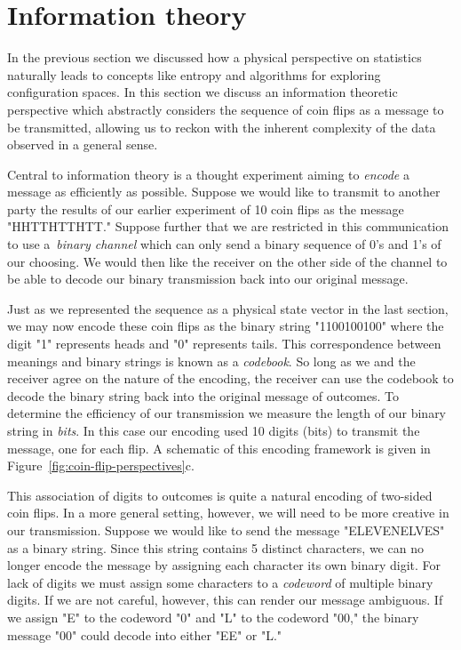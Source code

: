 \section{Information theory}
In the previous section we discussed how a physical perspective on statistics naturally leads to concepts like entropy and algorithms for exploring configuration spaces. In this section we discuss an information theoretic perspective which abstractly considers the sequence of coin flips as a message to be transmitted, allowing us to reckon with the inherent complexity of the data observed in a general sense. 

Central to information theory is a thought experiment aiming to \emph{encode} a message as efficiently as possible. Suppose we would like to transmit to another party the results of our earlier experiment of 10 coin flips as the message "HHTTHTTHTT." Suppose further that we are restricted in this communication to use a~\emph{binary channel} which can only send a binary sequence of 0's and 1's of our choosing. We would then like the receiver on the other side of the channel to be able to decode our binary transmission back into our original message. 

Just as we represented the sequence as a physical state vector in the last section, we may now encode these coin flips as the binary string "1100100100" where the digit "1" represents heads and "0" represents tails. This correspondence between meanings and binary strings is known as a \emph{codebook}. So long as we and the receiver agree on the nature of the encoding, the receiver can use the codebook to decode the binary string back into the original message of outcomes. To determine the efficiency of our transmission we measure the length of our binary string in \emph{bits}. In this case our encoding used 10 digits (bits) to transmit the message, one for each flip. A schematic of this encoding framework is given in Figure~\ref{fig:coin-flip-perspectives}c.

This association of digits to outcomes is quite a natural encoding of two-sided coin flips. In a more general setting, however, we will need to be more creative in our transmission. Suppose we would like to send the message "ELEVENELVES" as a binary string. Since this string contains 5 distinct characters, we can no longer encode the message by assigning each character its own binary digit. For lack of digits we must assign some characters to a \emph{codeword} of multiple binary digits. If we are not careful, however, this can render our message ambiguous. If we assign "E" to the codeword "0" and "L" to the codeword "00," the binary message "00" could decode into either "EE" or "L." 

